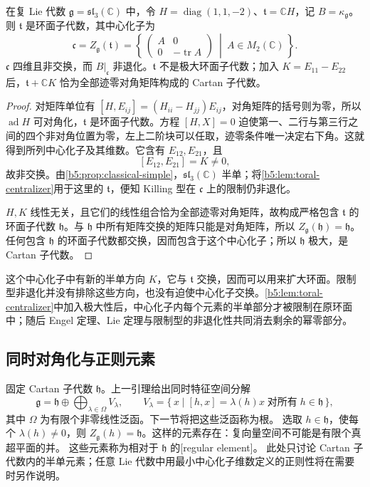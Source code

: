 \begin{proposition}\label{b5:prop:sl3-nonmaximal-toral-centralizer}
	在复 Lie 代数 \(\mathfrak g=\mathfrak{sl}_3(\mathbb C)\) 中，令 \(H=\operatorname{diag}(1,1,-2)\)、\(\mathfrak t=\mathbb CH\)，记 \(B=\kappa_{\mathfrak g}\)。则 \(\mathfrak t\) 是环面子代数，其中心化子为
	\[
		\mathfrak c=Z_{\mathfrak g}(\mathfrak t) =\left\{\,
		\begin{pmatrix}A&0\\0&-\operatorname{tr}A\end{pmatrix}
		\ \middle|\ A\in M_2(\mathbb C) \,\right\}.
	\]
	\(\mathfrak c\) 四维且非交换，而 \(B|_{\mathfrak c}\) 非退化。\(\mathfrak t\) 不是极大环面子代数；加入 \(K=E_{11}-E_{22}\) 后，\(\mathfrak t+\mathbb CK\) 恰为全部迹零对角矩阵构成的 Cartan 子代数。
\end{proposition}
\begin{proof}
	对矩阵单位有 \([H,E_{ij}]=(H_{ii}-H_{jj})E_{ij}\)，对角矩阵的括号则为零，所以 \(\operatorname{ad}H\) 可对角化，\(\mathfrak t\) 是环面子代数。方程 \([H,X]=0\) 迫使第一、二行与第三行之间的四个非对角位置为零，左上二阶块可以任取，迹零条件唯一决定右下角。这就得到所列中心化子及其维数。它含有 \(E_{12},E_{21}\)，且
	\[
		[E_{12},E_{21}]=K\ne0,
	\]
	故非交换。由\cref{b5:prop:classical-simple}，\(\mathfrak{sl}_3(\mathbb C)\) 半单；将\cref{b5:lem:toral-centralizer}用于这里的 \(\mathfrak t\)，便知 Killing 型在 \(\mathfrak c\) 上的限制仍非退化。

	\(H,K\) 线性无关，且它们的线性组合恰为全部迹零对角矩阵，故构成严格包含 \(\mathfrak t\) 的环面子代数 \(\mathfrak h\)。与 \(\mathfrak h\) 中所有矩阵交换的矩阵只能是对角矩阵，所以 \(Z_{\mathfrak g}(\mathfrak h)=\mathfrak h\)。任何包含 \(\mathfrak h\) 的环面子代数都交换，因而包含于这个中心化子；所以 \(\mathfrak h\) 极大，是 Cartan 子代数。
\end{proof}

这个中心化子中有新的半单方向 \(K\)，它与 \(\mathfrak t\) 交换，因而可以用来扩大环面。限制型非退化并没有排除这些方向，也没有迫使中心化子交换。\cref{b5:lem:toral-centralizer}中加入极大性后，中心化子内每个元素的半单部分才被限制在原环面中；随后 Engel 定理、Lie 定理与限制型的非退化性共同消去剩余的幂零部分。

\subsection{同时对角化与正则元素}
\label{b5:subsec:1601:02}

固定 Cartan 子代数 \(\mathfrak h\)。上一引理给出同时特征空间分解
\[
	\mathfrak g=\mathfrak h\oplus \bigoplus_{\lambda\in\Omega}V_\lambda,\qquad V_\lambda=\bigl\{\,x\mid[h,x]=\lambda(h)x\;\text{对所有}\;h\in\mathfrak h\,\bigr\},
\]
其中 \(\Omega\) 为有限个非零线性泛函。下一节将把这些泛函称为根。 选取 \(h\in\mathfrak h\)，使每个 \(\lambda(h)\ne0\)，则 \(Z_{\mathfrak g}(h)=\mathfrak h\)。这样的元素存在：复向量空间不可能是有限个真超平面的并。 这些元素称为相对于 \(\mathfrak h\) 的[regular element]。 此处只讨论 Cartan 子代数内的半单元素；任意 Lie 代数中用最小中心化子维数定义的正则性将在需要时另作说明。

